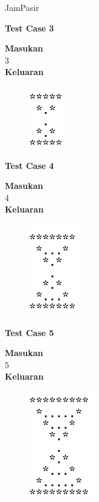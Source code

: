 \begin{permasalahan}{JamPasir}
\pagebreak
	\begin{center}
	\textbf{Test Case 3}\\
	\end{center}
	\textbf{Masukan}\\
	3\\
	\textbf{Keluaran}\\
		\begin{figure}[h!]
		\includegraphics{fig/JamPasir/3.png}	
		\end{figure}
	\begin{center}
	\textbf{Test Case 4}\\
	\end{center}
	\textbf{Masukan}\\
	4\\
	\textbf{Keluaran}\\
		\begin{figure}[h!]
		\includegraphics{fig/JamPasir/4.png}	
		\end{figure}
		\begin{center}
		\pagebreak
	\textbf{Test Case 5}\\
	\end{center}
	\textbf{Masukan}\\
	5\\
	\textbf{Keluaran}\\
		\begin{figure}[h!]
		\includegraphics{fig/JamPasir/5.png}	
		\end{figure}
			

\end{permasalahan}
